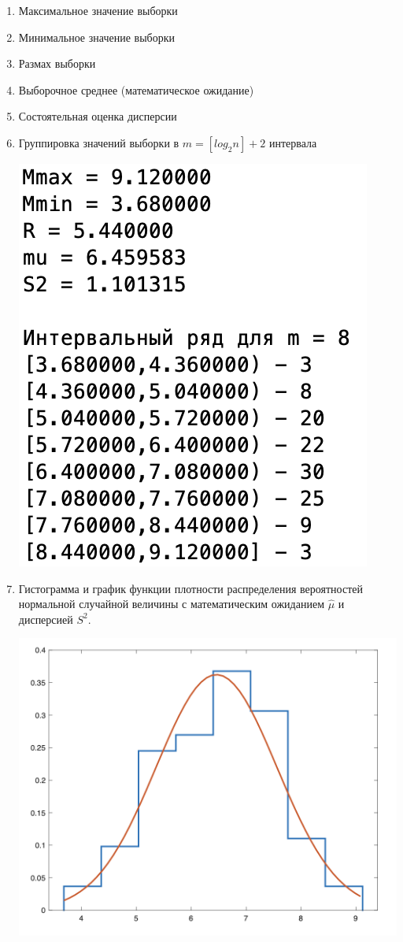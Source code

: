 \documentclass[a4paper,14pt]{extreport} %
\begin{document}
\begin{enumerate}
\item Максимальное значение выборки
\item Минимальное значение выборки
\item Размах выборки
\item Выборочное среднее (математическое ожидание)
\item Состоятельная оценка дисперсии
\item Группировка значений выборки в $m = [log_2 n] + 2$ интервала

\includegraphics{values}

\item Гистограмма и график функции плотности распределения вероятностей нормальной случайной величины с математическим ожиданием $\hat \mu$ и дисперсией $S^2$. 

\includegraphics{graph1}


\end{enumerate}
\end{document}

